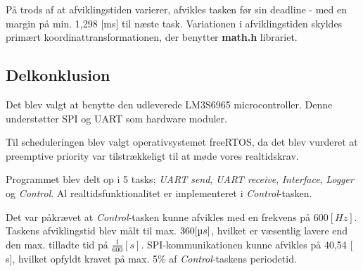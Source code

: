 På trods af at afviklingstiden varierer, afvikles tasken før sin deadline - med en margin på min. 1,298 [ms] til næste task. 
Variationen i afviklingstiden skyldes primært koordinattransformationen, der benytter \textbf{math.h} librariet. 

\subsection{Delkonklusion}
Det blev valgt at benytte den udleverede LM3S6965 microcontroller. Denne understøtter SPI og UART som hardware moduler. 

Til scheduleringen blev valgt operativsystemet freeRTOS, da det blev vurderet at preemptive priority var tilstrækkeligt til at møde vores realtidskrav. 

Programmet blev delt op i 5 tasks; \textit{UART send}, \textit{UART receive}, \textit{Interface}, \textit{Logger} og \textit{Control}. 
Al realtidsfunktionalitet er implementeret i \textit{Control}-tasken. 

Det var påkrævet at \textit{Control}-tasken kunne afvikles med en frekvens på $600 [Hz]$. 
Taskens afviklingstid blev målt til max. $360 [\micro s]$, hvilket er væsentlig lavere end den max. tilladte tid på $\frac{1}{600}  [s]$. 
SPI-kommunikationen kunne afvikles på 40,54 [ \micro s], hvilket opfyldt kravet på max. 5\% af \textit{Control}-taskens periodetid. 



